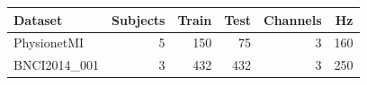 \begin{tabular}{lrrrrr}
\toprule
Dataset & Subjects & Train & Test & Channels & Hz \\
\midrule
PhysionetMI & 5 & 150 & 75 & 3 & 160 \\
BNCI2014\_001 & 3 & 432 & 432 & 3 & 250 \\
\bottomrule
\end{tabular}
